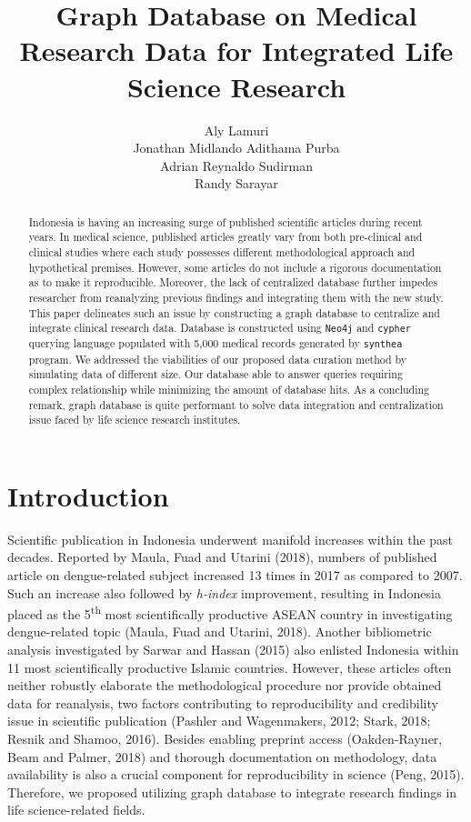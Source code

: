 \documentclass[]{article}
\title{Graph Database on Medical Research Data for Integrated Life Science
Research}
\author{Aly Lamuri \\ Jonathan Midlando Adithama Purba \\ Adrian Reynaldo Sudirman \\ Randy Sarayar}
\date{}
\begin{document}
\maketitle
\begin{abstract}
Indonesia is having an increasing surge of published scientific articles
during recent years. In medical science, published articles greatly vary
from both pre-clinical and clinical studies where each study possesses
different methodological approach and hypothetical premises. However,
some articles do not include a rigorous documentation as to make it
reproducible. Moreover, the lack of centralized database further impedes
researcher from reanalyzing previous findings and integrating them with
the new study. This paper delineates such an issue by constructing a
graph database to centralize and integrate clinical research data.
Database is constructed using \texttt{Neo4j} and \texttt{cypher}
querying language populated with 5,000 medical records generated by
\texttt{synthea} program. We addressed the viabilities of our proposed
data curation method by simulating data of different size. Our database
able to answer queries requiring complex relationship while minimizing
the amount of database hits. As a concluding remark, graph database is
quite performant to solve data integration and centralization issue
faced by life science research institutes.
\end{abstract}

\hypertarget{introduction}{%
\section{Introduction}\label{introduction}}

Scientific publication in Indonesia underwent manifold increases within
the past decades. Reported by Maula, Fuad and Utarini (2018), numbers of
published article on dengue-related subject increased 13 times in 2017
as compared to 2007. Such an increase also followed by \emph{h-index}
improvement, resulting in Indonesia placed as the 5\textsuperscript{th}
most scientifically productive ASEAN country in investigating
dengue-related topic (Maula, Fuad and Utarini, 2018). Another
bibliometric analysis investigated by Sarwar and Hassan (2015) also
enlisted Indonesia within 11 most scientifically productive Islamic
countries. However, these articles often neither robustly elaborate the
methodological procedure nor provide obtained data for reanalysis, two
factors contributing to reproducibility and credibility issue in
scientific publication (Pashler and Wagenmakers, 2012; Stark, 2018;
Resnik and Shamoo, 2016). Besides enabling preprint access
(Oakden-Rayner, Beam and Palmer, 2018) and thorough documentation on
methodology, data availability is also a crucial component for
reproducibility in science (Peng, 2015). Therefore, we proposed
utilizing graph database to integrate research findings in life
science-related fields.
\end{document}
